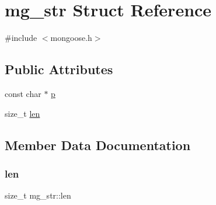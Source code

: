 \hypertarget{structmg__str}{}\section{mg\+\_\+str Struct Reference}
\label{structmg__str}


{\ttfamily \#include $<$mongoose.\+h$>$}

\subsection*{Public Attributes}
\begin{DoxyCompactItemize}
\item 
const char $\ast$ \hyperlink{structmg__str_a1e743a766f92c904d25fe4d058017486_a1e743a766f92c904d25fe4d058017486}{p}
\item 
size\+\_\+t \hyperlink{structmg__str_a53945bdd422bf389d74b863f23cd4463_a53945bdd422bf389d74b863f23cd4463}{len}
\end{DoxyCompactItemize}


\subsection{Member Data Documentation}
\mbox{\label{structmg__str_a53945bdd422bf389d74b863f23cd4463_a53945bdd422bf389d74b863f23cd4463}} 
\subsubsection{\texorpdfstring{len}{len}}
{\footnotesize\ttfamily size\+\_\+t mg\+\_\+str\+::len}



